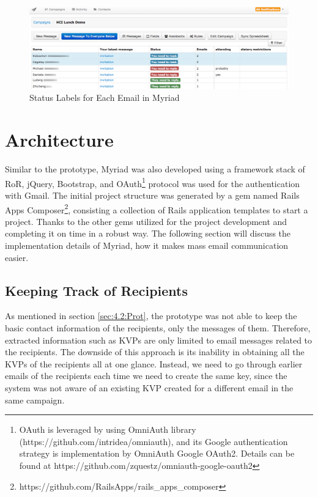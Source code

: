 \clearpage

\begin{figure}[htbp]
	\centering
	\includegraphics[width=1.00\textwidth]{imgs/EmailStatuses.png}
	\caption[Status Labels for Each Email in Myriad]{Status Labels for Each Email in Myriad}
	\label{fig:EmailStatuses}
\end{figure}

\section{Architecture}
\label{sec:5.3:FinaArch}

Similar to the prototype, Myriad was also developed using a framework stack of \ac{RoR}, jQuery, Bootstrap, and OAuth\footnote{OAuth is leveraged by using OmniAuth library (https://github.com/intridea/omniauth), and its Google authentication strategy is implementation by OmniAuth Google OAuth2. Details can be found at https://github.com/zquestz/omniauth-google-oauth2} protocol was used for the authentication with Gmail. The initial project structure was generated by a gem named Rails Apps Composer\footnote{https://github.com/RailsApps/rails\_apps\_composer}, consisting a collection of Rails application templates to start a project. Thanks to the other gems utilized for the project development and completing it on time in a robust way. The following section will discuss the implementation details of Myriad, how it makes mass email communication easier.

\subsection{Keeping Track of Recipients}
\label{subsec:5.3.1:ReciCont}

As mentioned in section \ref{sec:4.2:Prot}, the prototype was not able to keep the basic contact information of the recipients, only the messages of them. Therefore, extracted information such as \ac{KVP}s are only limited to email messages related to the recipients. The downside of this approach is its inability in obtaining all the \ac{KVP}s of the recipients all at one glance. Instead, we need to go through earlier emails of the recipients each time we need to create the same key, since the system was not aware of an existing \ac{KVP} created for a different email in the same campaign.
\vspace{1cm}

